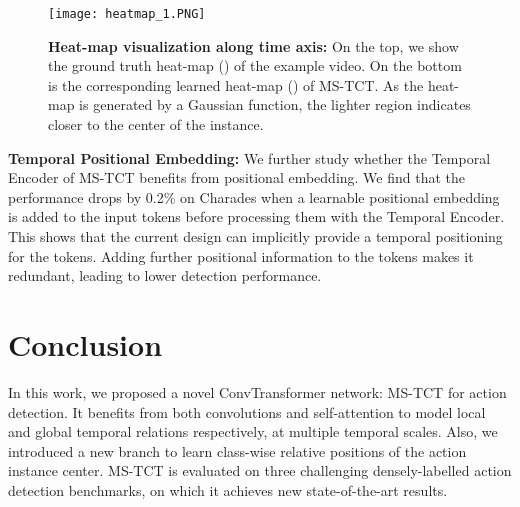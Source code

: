 \documentclass[10pt,twocolumn,letterpaper]{article}
\begin{document}
\begin{figure}[t!]
\centering
\texttt{[image: heatmap\_1.PNG]} \caption{\textbf{Heat-map visualization along time axis:} On the top, we show the ground truth heat-map () of the example video. On the bottom is the corresponding learned heat-map () of MS-TCT. As the heat-map is generated by a Gaussian function, the lighter region indicates closer to the center of the instance. 
}
\label{fig:heatmap}
\end{figure}

\iffalse
\noindent\textbf{Number of Tokens .}
As mentioned in the implementation details, we randomly select consecutive  tokens for each video in the training phase and utilize the sliding window at inference. 
Here, we have studied how the number of tokens  affects the action detection performance. 
When  is set to 128, 256 and 512 tokens, MS-TCT achieves 25.0\%, 25.4\% and 25.5\% on Charades. There is no significant difference in the action detection performance while changing the number of input tokens. However, increasing the number of tokens  in MS-TCT increases the FLOPs. For the trade-off between the computation cost and performance precision, we set  to 256 tokens, which corresponds to 2048 frames (about~86 sec.) of video. 
\fi

\noindent\textbf{Temporal Positional Embedding:}
We further study whether the Temporal Encoder of MS-TCT benefits from positional embedding. 
We find that the performance drops by 0.2\% on Charades when a learnable positional embedding~\cite{dosovitskiy2020image} is added to the input tokens before processing them with the Temporal Encoder. This shows that the current design can implicitly provide a temporal positioning for the tokens. Adding further positional information to the tokens makes it redundant, leading to lower detection performance. 

\iffalse
\noindent\textbf{Method Limitation.}
Although MS-TCT has outperformed state-of-the-art methods on three challenging datasets, the performance is still relatively low (e.g., less than 30\% on Charades). One of the reasons is that the Visual Encoder and the Temporal Encoder in MS-TCT are not optimized jointly in our network, due to hardware limitation. Our future work will focus on modeling the temporal and spatial relations end-to-end for long untrimmed videos.    
\fi

\vspace{0.1in}
\section{Conclusion}
\label{sec:conclusion}
In this work, we proposed a novel ConvTransformer network: MS-TCT for action detection. It benefits from both convolutions and self-attention to model local and global temporal relations respectively, at multiple temporal scales. Also, we introduced a new branch to learn class-wise relative positions of the action instance center. MS-TCT is evaluated on three challenging densely-labelled action detection benchmarks, on which it achieves new state-of-the-art results.
\end{document}
